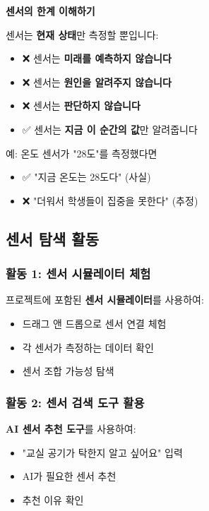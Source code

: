 \documentclass[11pt, a4paper]{article}
\begin{document}
\begin{warning}
\textbf{센서의 한계 이해하기}

센서는 \textbf{현재 상태}만 측정할 뿐입니다:
\begin{itemize}
  \item ❌ 센서는 \textbf{미래를 예측하지 않습니다}
  \item ❌ 센서는 \textbf{원인을 알려주지 않습니다}
  \item ❌ 센서는 \textbf{판단하지 않습니다}
  \item ✅ 센서는 \textbf{지금 이 순간의 값}만 알려줍니다
\end{itemize}

예: 온도 센서가 "28도"를 측정했다면
\begin{itemize}
  \item ✅ "지금 온도는 28도다" (사실)
  \item ❌ "더워서 학생들이 집중을 못한다" (추정)
\end{itemize}
\end{warning}

\subsection{센서 탐색 활동}

\subsubsection{활동 1: 센서 시뮬레이터 체험}

프로젝트에 포함된 \textbf{센서 시뮬레이터}를 사용하여:
\begin{itemize}
  \item 드래그 앤 드롭으로 센서 연결 체험
  \item 각 센서가 측정하는 데이터 확인
  \item 센서 조합 가능성 탐색
\end{itemize}

\subsubsection{활동 2: 센서 검색 도구 활용}

\textbf{AI 센서 추천 도구}를 사용하여:
\begin{itemize}
  \item "교실 공기가 탁한지 알고 싶어요" 입력
  \item AI가 필요한 센서 추천
  \item 추천 이유 확인
\end{itemize}
\end{document}
